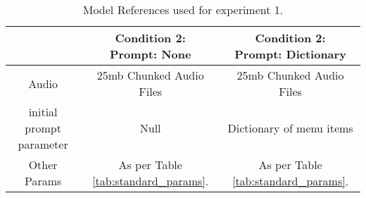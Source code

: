 

\begin{table}[ht]
    \centering
    \begin{tabular}{|c|c|c|}
        \hline  & \makecell{\textbf{Condition 2:} \\Prompt: None} & \makecell{\textbf{Condition 2:} \\Prompt: Dictionary} \\
        \hline Audio & 25mb Chunked Audio Files & 25mb Chunked Audio Files \\
        \hline initial prompt parameter & Null & Dictionary of menu items \\
        \hline Other Params & As per Table \ref{tab:standard_params}. & As per Table \ref{tab:standard_params}. \\
        
  \hline

    \end{tabular}
    \caption{Model References used for experiment 1.}
    \label{tab:experiment_1}
\end{table}